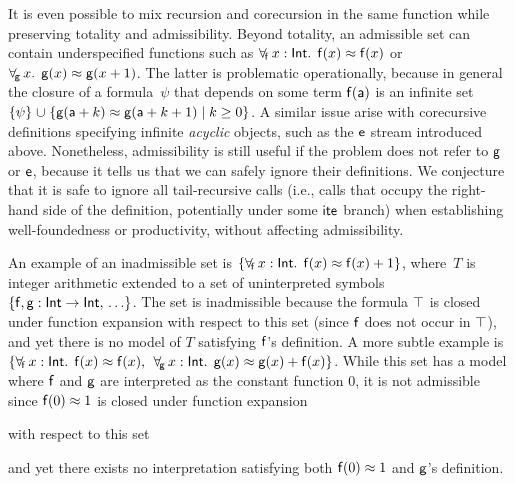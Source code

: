 It is even possible to mix recursion and corecursion in the same function
\cite{blanchette-et-al-2015-fouco} while preserving totality and admissibility.
Beyond totality, an admissible set can contain underspecified functions
such as $\forall_{\!\mathsf{f}\:} x : \mathsf{Int}.\allowbreak\;\, \mathsf{f}( x )
\approx \mathsf{f}( x )$ or $\forall_{\!\mathsf{g}\:} x.\allowbreak\;\, \mathsf{g}( x
) \approx \mathsf{g}( x + 1 )$. The latter is problematic operationally, because
in general the closure of a formula~$\psi$ that depends on some term
$\mathsf{f}(\mathsf{a})$ is an infinite set
$\{\psi\} \cup \{\con {g}(\con{a}+k) \teq \con {g}(\con{a}+k+1) \mid k \geq 0\}$.
A similar issue arise with corecursive definitions specifying infinite
\emph{acyclic} objects, such as the $\mathsf{e}$ stream introduced above.
Nonetheless, admissibility is still useful if the problem does not refer to
$\mathsf{g}$ or $\mathsf{e}$, because it tells us that we can safely ignore their
definitions.
%
We conjecture that it is safe to ignore all tail-recursive calls (i.e., calls that
occupy the right-hand side of the definition, potentially under some $\mathsf{ite}$
branch) when establishing well-foundedness or productivity, without affecting
admissibility.

An example of an inadmissible set is
$\{ \forall_{\!\mathsf{f}\:} x : \mathsf{Int}.\;\, \mathsf{f}( x ) \approx \mathsf{f}( x ) + 1 \}$,
where~$T$ is integer arithmetic extended to a set of uninterpreted symbols
$\{\mathsf{f}, \mathsf{g} :\mathsf{Int} \rightarrow \mathsf{Int},\, \ldots \}$.
The set is inadmissible because the formula $\top$ is
closed under function expansion with respect to this set
(since $\mathsf{f}$ does not occur in $\top$),
and yet there is no model of $T$
satisfying $\mathsf{f}$'s definition. A more subtle example is
$\{\forall_{\!\mathsf{f}\:} x : \mathsf{Int}.\;\, \mathsf{f}( x ) \approx \mathsf{f}( x ),\allowbreak\;\, \forall_{\!\mathsf{g}\:} x : \mathsf{Int}.\;\, \mathsf{g}( x ) \approx \mathsf{g}( x ) + \nobreak\mathsf{f}( x )\}$.
While this set has a model where $\mathsf{f}$ and $\mathsf{g}$ are interpreted as the
constant function $0$, it is not admissible since %
$\mathsf{f}( 0 ) \approx 1$ is
closed under function expansion \begin{rep}with respect to this set\end{rep}
and yet there exists
no interpretation satisfying both $\mathsf{f}( 0 ) \approx 1$ and $\mathsf{g}$'s
definition.


